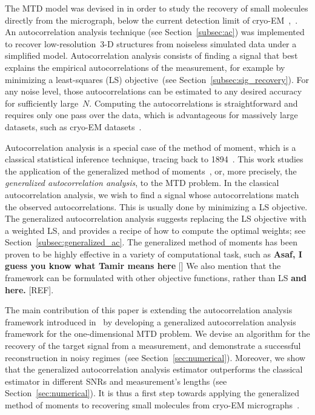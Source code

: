 \documentclass{article}
\begin{document}
The MTD model was devised in \cite{bendory2018toward} in order to study the recovery of small molecules directly from the micrograph, below the current detection limit of \mbox{cryo-EM}~\cite{henderson1995potential},~\cite{d2021current}. An autocorrelation analysis technique (see Section~\ref{subsec:ac}) was implemented to recover \mbox{low-resolution}~\mbox{3-D} structures from noiseless simulated data under a simplified model. Autocorrelation analysis consists of finding a signal that best explains the empirical autocorrelations of the measurement, for example by minimizing a {least-squares} (LS) objective~(see Section~\ref{subsec:sig_recovery}). For any noise level, those autocorrelations can be estimated to any desired accuracy for sufficiently large~$N$. Computing the autocorrelations is straightforward and requires only one pass over the data, which is advantageous for massively large datasets, such as \mbox{cryo-EM} datasets~\cite{bendory2020single}.

Autocorrelation analysis is a special case of the method of moment, which is a classical statistical inference technique, tracing back to 1894~\cite{pearson1894contributions}. This work studies the application of the generalized method of moments~\cite{Hansen1982}, or, more precisely, the \textit{generalized autocorrelation analysis}, to the MTD problem. In the classical autocorrelation analysis, we wish to find a signal whose autocorrelations match the observed autocorrelations. This is usually done by minimizing a LS objective. The generalized autocorrelation analysis suggests replacing the LS objective with a weighted LS, and provides a recipe of how to compute the optimal weights; see Section~\ref{subsec:generalized_ac}. The generalized method of moments has been proven to be highly effective in a variety of computational task, such as \textbf{Asaf, I guess you know what Tamir means here} [] %
We also mention that the framework can be formulated with other objective functions, rather than LS \textbf{and here.} [REF].

The main contribution of this paper is extending the autocorrelation analysis framework introduced in~\cite{bendory2019multi} by developing a generalized autocorrelation analysis framework for the one-dimensional MTD problem. We devise an algorithm for the recovery of the target signal from a measurement, and demonstrate a successful reconstruction in noisy regimes~(see Section~\ref{sec:numerical}). Moreover, we show that the generalized autocorrelation analysis estimator outperforms the classical estimator in different SNRs and measurement's lengths (see Section~\ref{sec:numerical}). It is thus a first step towards applying the generalized method of moments to recovering small molecules from \mbox{cryo-EM} micrographs~\cite{bendory2018toward}.
\end{document}
